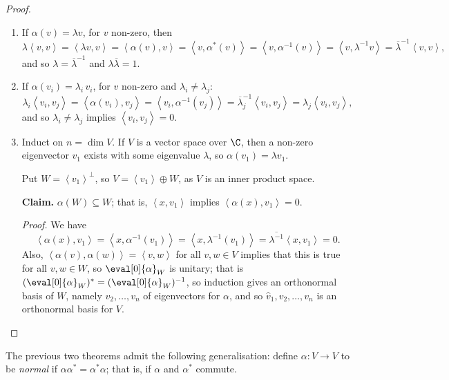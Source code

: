 \begin{proof}
\mbox{}
\begin{enumerate}
	\item If $\alpha(v)=\lambda v$, for $v$ non-zero, then
	\begin{equation*}
		\lambda\left\langle v,v \right\rangle
		= \left\langle \lambda v,v \right\rangle
		= \left\langle \alpha(v),v \right\rangle
		= \left\langle v,\alpha^*(v) \right\rangle
		= \left\langle v,\alpha^{-1}(v) \right\rangle
		= \left\langle v,\lambda^{-1} v \right\rangle
		= \overline{\lambda}^{-1} \left\langle v,v \right\rangle,
	\end{equation*}
	and so $\lambda=\overline{\lambda}^{-1}$ and $\lambda\overline{\lambda}=1$.
	\item If $\alpha(v_i) = \lambda_i\,v_i$, for $v$ non-zero and $\lambda_i\neq \lambda_j$:
	\begin{equation*}
		\lambda_i\left\langle v_i,v_j \right\rangle
		= \left\langle \alpha(v_i),v_j \right\rangle
		= \left\langle v_i,\alpha^{-1}(v_j) \right\rangle
		= \overline{\lambda}_j^{-1}\left\langle v_i,v_j \right\rangle
		= \lambda_j \left\langle v_i,v_j \right\rangle,
	\end{equation*}
	and so $\lambda_i\neq \lambda_j$ implies $\left\langle v_i,v_j \right\rangle=0$.
	
	\item Induct on $n=\dim V$. If $V$ is a vector space over $\C$, then a non-zero eigenvector $v_1$ exists with some eigenvalue $\lambda$, so $\alpha(v_1)=\lambda v_1$. %
	
	Put $W=\left\langle v_1 \right\rangle^\perp$, so $V=\left\langle v_1 \right\rangle\oplus W$, as $V$ is an inner product space. %
	
	\textbf{Claim.} $\alpha(W)\subseteq W$; that is, $\left\langle x,v_1 \right\rangle$ implies $\left\langle \alpha(x),v_1 \right\rangle = 0$. %
	
	\emph{Proof.} We have
	\begin{equation*}
		\left\langle \alpha(x),v_1 \right\rangle
		= \left\langle x,\alpha^{-1}(v_1) \right\rangle
                = \left\langle x,\lambda^{-1}(v_1) \right\rangle %
		= \overline{\lambda^{-1}}\left\langle x,v_1 \right\rangle = 0. %
	\end{equation*}
	Also, $\left\langle \alpha(v),\alpha(w) \right\rangle=\left\langle v,w \right\rangle$ for all $v,w\in V$ implies that this is true for all $v,w\in W$, so $\eval[0]{\alpha}_W$ is unitary; that is $(\eval[0]{\alpha}_W)^* = (\eval[0]{\alpha}_W)^{-1}$, so induction gives an orthonormal basis of $W$, namely $v_2,\ldots,v_n$ of eigenvectors for $\alpha$, and so $\hat{v}_1,v_2,\ldots,v_n$ is an orthonormal basis for $V$. \qedhere %
\end{enumerate}
\end{proof}
\vspace{3pt}
\begin{remark}
	The previous two theorems admit the following generalisation: define $\alpha:V\to V$ to be \emph{normal} if $\alpha\alpha^* = \alpha^*\alpha$; that is, if $\alpha$ and $\alpha^*$ commute. %
\end{remark}

